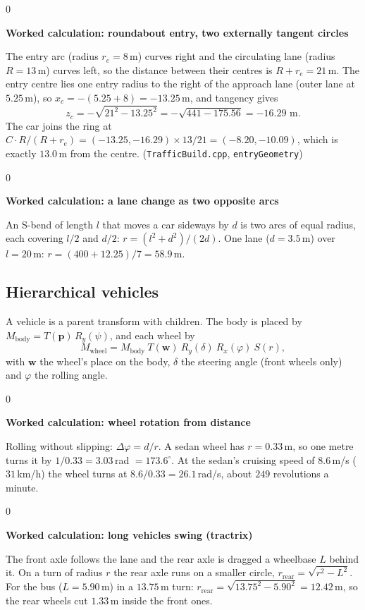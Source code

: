 \documentclass[11pt,a4paper]{article}
\newcommand{\code}[1]{\texttt{\small #1}}
\newenvironment{calc}[1]{\par\smallskip\noindent\begin{minipage}{\textwidth}\setlength{\fboxsep}{6pt}\begin{lrbox}{0}\begin{minipage}{0.955\textwidth}\textbf{Worked calculation: #1}\par\smallskip}{\end{minipage}\end{lrbox}\fbox{\usebox{0}}\end{minipage}\par\smallskip}
\begin{document}
\begin{calc}{roundabout entry, two externally tangent circles}
The entry arc (radius $r_e = 8$\,m) curves right and the circulating lane (radius $R = 13$\,m) curves left, so the distance between their centres is $R + r_e = 21$\,m. The entry centre lies one entry radius to the right of the approach lane (outer lane at $5.25$\,m), so $x_c = -(5.25 + 8) = -13.25$\,m, and tangency gives
\[
z_c = -\sqrt{21^2 - 13.25^2} = -\sqrt{441 - 175.56} = -16.29\text{ m}.
\]
The car joins the ring at $C\cdot R/(R+r_e) = (-13.25, -16.29)\times 13/21 = (-8.20, -10.09)$, which is exactly $13.0$\,m from the centre. (\code{TrafficBuild.cpp}, \code{entryGeometry})
\end{calc}

\begin{calc}{a lane change as two opposite arcs}
An S-bend of length $l$ that moves a car sideways by $d$ is two arcs of equal radius, each covering $l/2$ and $d/2$: $r = (l^2 + d^2)/(2d)$. One lane ($d = 3.5$\,m) over $l = 20$\,m: $r = (400 + 12.25)/7 = 58.9$\,m.
\end{calc}

\subsection{Hierarchical vehicles}
A vehicle is a parent transform with children. The body is placed by $M_{\text{body}} = T(\mathbf{p})\,R_y(\psi)$, and each wheel by
\[
M_{\text{wheel}} = M_{\text{body}}\ T(\mathbf{w})\ R_y(\delta)\ R_x(\varphi)\ S(r),
\]
with $\mathbf{w}$ the wheel's place on the body, $\delta$ the steering angle (front wheels only) and $\varphi$ the rolling angle.
\begin{calc}{wheel rotation from distance}
Rolling without slipping: $\Delta\varphi = d/r$. A sedan wheel has $r = 0.33$\,m, so one metre turns it by $1/0.33 = 3.03$\,rad $= 173.6^\circ$. At the sedan's cruising speed of $8.6$\,m/s ($31$\,km/h) the wheel turns at $8.6/0.33 = 26.1$\,rad/s, about $249$ revolutions a minute.
\end{calc}

\begin{calc}{long vehicles swing (tractrix)}
The front axle follows the lane and the rear axle is dragged a wheelbase $L$ behind it. On a turn of radius $r$ the rear axle runs on a smaller circle, $r_{\text{rear}} = \sqrt{r^2 - L^2}$. For the bus ($L = 5.90$\,m) in a $13.75$\,m turn: $r_{\text{rear}} = \sqrt{13.75^2 - 5.90^2} = 12.42$\,m, so the rear wheels cut $1.33$\,m inside the front ones.
\end{calc}
\end{document}
